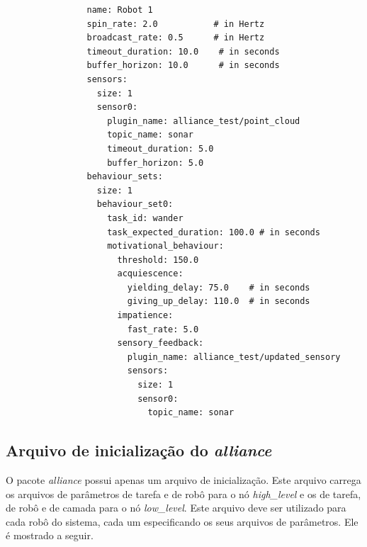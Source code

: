             \begin{lstlisting}
                name: Robot 1
                spin_rate: 2.0           # in Hertz
                broadcast_rate: 0.5      # in Hertz
                timeout_duration: 10.0    # in seconds
                buffer_horizon: 10.0      # in seconds
                sensors:
                  size: 1
                  sensor0:
                    plugin_name: alliance_test/point_cloud
                    topic_name: sonar
                    timeout_duration: 5.0
                    buffer_horizon: 5.0
                behaviour_sets:
                  size: 1
                  behaviour_set0:
                    task_id: wander
                    task_expected_duration: 100.0 # in seconds
                    motivational_behaviour:
                      threshold: 150.0
                      acquiescence:
                        yielding_delay: 75.0    # in seconds
                        giving_up_delay: 110.0  # in seconds
                      impatience:
                        fast_rate: 5.0
                      sensory_feedback:
                        plugin_name: alliance_test/updated_sensory
                        sensors:
                          size: 1
                          sensor0:
                            topic_name: sonar
            \end{lstlisting}
            
        \subsection{Arquivo de inicialização do \textit{alliance}} \label{subsec:alliance_launch}
            O pacote \textit{alliance} possui apenas um arquivo de inicialização. Este arquivo carrega os arquivos de parâmetros de tarefa e de robô para o nó \textit{high\_level} e os de tarefa, de robô e de camada para o nó \textit{low\_level}. Este arquivo deve ser utilizado para cada robô do sistema, cada um especificando os seus arquivos de parâmetros. Ele é mostrado a seguir.
            
            

